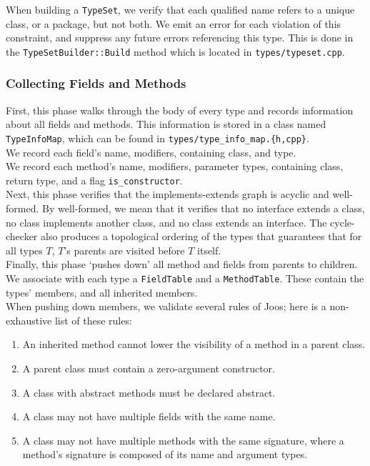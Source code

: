 \documentclass[12pt, titlepage]{article}
\newcommand{\z}[1]{\texttt{#1}}
\begin{document}
When building a \z{TypeSet}, we verify that each qualified name refers to a
unique class, or a package, but not both. We emit an error for each violation
of this constraint, and suppress any future errors referencing this type. This
is done in the \z{TypeSetBuilder::Build} method which is located in
\z{types/typeset.cpp}.

\subsubsection{Collecting Fields and Methods}\label{subsubsec:fields}

First, this phase walks through the body of every type and records information
about all fields and methods. This information is stored in a class named
\z{TypeInfoMap}, which can be found in \z{types/type\_info\_map.\{h,cpp\}}. \\
We record each field's name, modifiers, containing class, and type. \\
We record each method's name, modifiers, parameter types, containing class,
return type, and a flag \z{is\_constructor}.\\

Next, this phase verifies that the implements-extends graph is acyclic and
well-formed. By well-formed, we mean that it verifies that no interface extends
a class, no class implements another class, and no class extends an interface.
The cycle-checker also produces a topological ordering of the types that
guarantees that for all types $T$, $T$'s parents are visited before $T$
itself.\\

Finally, this phase `pushes down' all method and fields from parents to
children. We associate with each type a \z{FieldTable} and a \z{MethodTable}. These
contain the types' members, and all inherited members.\\
When pushing down members, we validate several rules of Joos; here is a
non-exhaustive list of these rules:
\begin{enumerate}
  \item An inherited method cannot lower the visibility of a method in a parent
  class.

  \item A parent class must contain a zero-argument constructor.

  \item A class with abstract methods must be declared abstract.

  \item A class may not have multiple fields with the same name.

  \item A class may not have multiple methods with the same signature, where a method's signature is composed of its name and argument types.
\end{enumerate}
\end{document}
